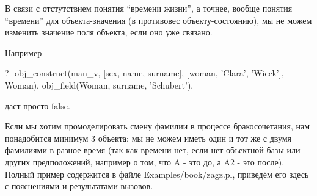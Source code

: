 \documentclass[a4paper]{book}
\begin{document}
В связи с отстутствием понятия ``времени жизни'', а точнее,
вообще понятия ``времени'' для объекта-значения (в противовес
объекту-состоянию), мы не можем изменить значение поля объекта,
если оно уже связано.

Например

\begin{example}{}{}
?- obj_construct(man_v, [sex, name, surname], 
                        [woman, 'Clara', 'Wieck'], Woman), 
   obj_field(Woman, surname, 'Schubert').
\end{example}

даст просто false.

Если мы хотим промоделировать смену фамилии в процессе
бракосочетания, нам понадобится минимум 3 объекта: мы не можем
иметь один и тот же с двумя фамилиями в разное время (так как
времени нет, если нет объектной базы или других предположений,
например о том, что A - это до, а A2 - это после). Полный пример
содержится в файле Examples/book/zagz.pl, приведём его здесь с
пояснениями и результатами вызовов.
\end{document}
